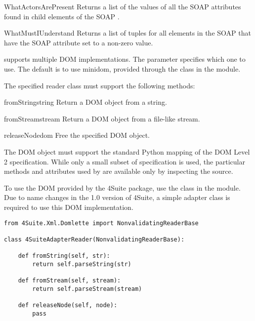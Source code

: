 \begin{methoddesc}{WhatActorsArePresent}{}
Returns a list of the values of all the SOAP  attributes
found in child elements of the SOAP .
\end{methoddesc}

\begin{methoddesc}{WhatMustIUnderstand}{}
Returns a list of  tuples for all elements in the
SOAP  that have the SOAP  attribute set
to a non-zero value.
\end{methoddesc}

\ZSI{} supports multiple DOM implementations.
The  parameter specifies which one to use.
The default is to use minidom, provided through the  class
in the  module.

The specified reader class must support the following methods:

\begin{methoddesc}{fromString}{string}
Return a DOM object from a string.
\end{methoddesc}

\begin{methoddesc}{fromStream}{stream}
Return a DOM object from a file-like stream.
\end{methoddesc}

\begin{methoddesc}{releaseNode}{dom}
Free the specified DOM object.
\end{methoddesc}

The DOM object must support the standard Python mapping of the DOM Level 2
specification.
While only a small subset of specification is used, the particular
methods and attributes used by \ZSI{} are available only
by inspecting the source.

To use the  DOM provided by the 4Suite package, use the
 class in the  module.
Due to name changes in the 1.0 version of 4Suite, a simple adapter class
is required to use this DOM implementation.

\begin{verbatim}
from 4Suite.Xml.Domlette import NonvalidatingReaderBase

class 4SuiteAdapterReader(NonvalidatingReaderBase):

    def fromString(self, str):
        return self.parseString(str)

    def fromStream(self, stream):
        return self.parseStream(stream)

    def releaseNode(self, node):
        pass
\end{verbatim}
